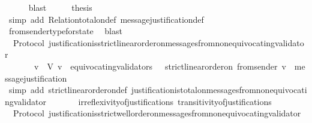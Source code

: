 \begin{isabellebody}
\ \ \ \ \isamarkupfalse%
\ blast\isanewline
\ \ \isamarkupfalse%
\ \isamarkupfalse%
\ {\isacharquery}thesis\isanewline
\ \ \ \ \isamarkupfalse%
\ {\isacharparenleft}simp\ add{\isacharcolon}\ Relation{\isachardot}total{\isacharunderscore}on{\isacharunderscore}def\ message{\isacharunderscore}justification{\isacharunderscore}def{\isacharparenright}\isanewline
\ \ \ \ \isamarkupfalse%
\ from{\isacharunderscore}sender{\isacharunderscore}type{\isacharunderscore}for{\isacharunderscore}state\ \isamarkupfalse%
\ blast\isanewline
{}\isamarkupfalse%
%
\endisatagproof
{\isafoldproof}%
%
\isadelimproof
\isanewline
%
\endisadelimproof
\isanewline
{}\isamarkupfalse%
\ {\isacharparenleft}\ Protocol{\isacharparenright}\ justification{\isacharunderscore}is{\isacharunderscore}strict{\isacharunderscore}linear{\isacharunderscore}order{\isacharunderscore}on{\isacharunderscore}messages{\isacharunderscore}from{\isacharunderscore}non{\isacharunderscore}equivocating{\isacharunderscore}validator{\isacharcolon}\isanewline
\ \ {\isachardoublequoteopen}{\isasymforall}\ {\isasymsigma}\ {\isasymin}\ {\isasymSigma}{\isachardot}\ {\isacharparenleft}{\isasymforall}\ v\ {\isasymin}\ V{\isachardot}\ v\ {\isasymnotin}\ equivocating{\isacharunderscore}validators\ {\isasymsigma}\ {\isasymlongrightarrow}\ strict{\isacharunderscore}linear{\isacharunderscore}order{\isacharunderscore}on\ {\isacharparenleft}from{\isacharunderscore}sender\ {\isacharparenleft}v{\isacharcomma}\ {\isasymsigma}{\isacharparenright}{\isacharparenright}\ message{\isacharunderscore}justification{\isacharparenright}{\isachardoublequoteclose}\isanewline
%
\isadelimproof
\ \ %
\endisadelimproof
%
\isatagproof
{}\isamarkupfalse%
\ {\isacharparenleft}simp\ add{\isacharcolon}\ strict{\isacharunderscore}linear{\isacharunderscore}order{\isacharunderscore}on{\isacharunderscore}def\ justification{\isacharunderscore}is{\isacharunderscore}total{\isacharunderscore}on{\isacharunderscore}messages{\isacharunderscore}from{\isacharunderscore}non{\isacharunderscore}equivocating{\isacharunderscore}validator\ \isanewline
\ \ \ \ \ \ irreflexivity{\isacharunderscore}of{\isacharunderscore}justifications\ transitivity{\isacharunderscore}of{\isacharunderscore}justifications{\isacharparenright}%
\endisatagproof
{\isafoldproof}%
%
\isadelimproof
\isanewline
%
\endisadelimproof
\isanewline
\isanewline
{}\isamarkupfalse%
\ {\isacharparenleft}\ Protocol{\isacharparenright}\ justification{\isacharunderscore}is{\isacharunderscore}strict{\isacharunderscore}well{\isacharunderscore}order{\isacharunderscore}on{\isacharunderscore}messages{\isacharunderscore}from{\isacharunderscore}non{\isacharunderscore}equivocating{\isacharunderscore}validator{\isacharcolon}\isanewline

\end{isabellebody}
